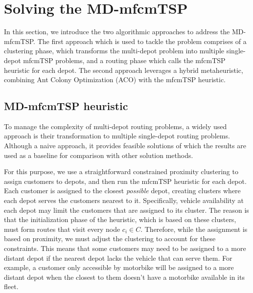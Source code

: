 \documentclass{article}
\begin{document}
	\section{Solving the MD-mfcmTSP}
	In this section, we introduce the two algorithmic approaches to address the MD-mfcmTSP. The first approach which is used to tackle the problem comprises of a clustering phase, which transforms the multi-depot problem into multiple single-depot mfcmTSP problems, and a routing phase which calls the mfcmTSP heuristic for each depot. The second approach leverages a hybrid metaheuristic, combining Ant Colony Optimization (ACO) with the mfcmTSP heuristic.
	\subsection{MD-mfcmTSP heuristic}
	To manage the complexity of multi-depot routing problems, a widely used approach is their transformation to multiple single-depot routing problems. Although a naive approach, it provides feasible solutions of which the results are used as a baseline for comparison with other solution methods.
	\par 
	For this purpose, we use a straightforward constrained proximity clustering to assign customers to depots, and then run the mfcmTSP heuristic for each depot. Each customer is assigned to the closest \textit{possible} depot, creating clusters where each depot serves the customers nearest to it. Specifically, vehicle availability at each depot may limit the customers that are assigned to its cluster. The reason is that the initialization phase of the heuristic, which is based on these clusters, must form routes that visit every node $c_i\in C$. Therefore, while the assignment is based on proximity, we must adjust the clustering to account for these constraints. This means that some customers may need to be assigned to a more distant depot if the nearest depot lacks the vehicle that can serve them. For example, a customer only accessible by motorbike will be assigned to a more distant depot when the closest to them doesn't have a motorbike available in its fleet.
\end{document}
